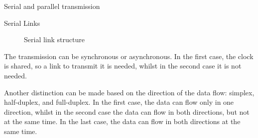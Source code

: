 \begin{section}{Serial and parallel transmission}
\begin{subsection}{Serial Links}
\begin{figure}[H]
      \caption{Serial link structure}
      \label{fig:serial-link}
    \end{figure}
    The transmission can be synchronous or asynchronous. In the first case, the clock is shared, so
    a link to transmit it is needed, whilst in the second case it is not needed.\\
  \end{subsection}

  Another distinction can be made based on the direction of the data flow: simplex, half-duplex, and 
  full-duplex. In the first case, the data can flow only in one direction, whilst in the second case
  the data can flow in both directions, but not at the same time. In the last case, the data can
  flow in both directions at the same time.
\end{section}

